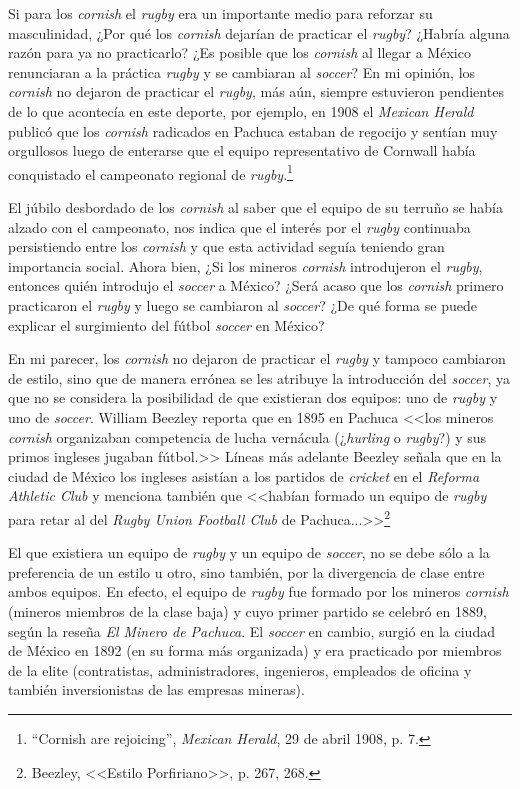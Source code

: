 \documentclass[11pt,a5paper,twoside]{book} %
\begin{document}
Si para los \emph{cornish} el \emph{rugby} era un importante medio para reforzar su masculinidad, ¿Por qué los \emph{cornish} dejarían de practicar el \emph{rugby}? ¿Habría alguna razón para ya no practicarlo? ¿Es posible que los \emph{cornish} al llegar a México renunciaran a la práctica \emph{rugby} y se cambiaran al \emph{soccer}? En mi opinión, los \emph{cornish} no dejaron de practicar el \emph{rugby}, más aún, siempre estuvieron pendientes de lo que acontecía en este deporte, por ejemplo, en 1908 el \emph{Mexican Herald} publicó que los \emph{cornish} radicados en Pachuca estaban de regocijo y sentían muy orgullosos luego de enterarse que el equipo representativo de Cornwall había conquistado el campeonato regional de \emph{rugby}.\footnote{``Cornish are rejoicing'', \emph{Mexican Herald}, 29 de abril 1908, p. 7.}

El júbilo desbordado de los \emph{cornish} al saber que el equipo de su terruño se había alzado con el campeonato, nos indica que el interés por el \emph{rugby} continuaba persistiendo entre los \emph{cornish} y que esta actividad seguía teniendo gran importancia social. Ahora bien, ¿Si los mineros \emph{cornish} introdujeron el \emph{rugby}, entonces quién introdujo el \emph{soccer} a México? ¿Será acaso que los \emph{cornish} primero practicaron el \emph{rugby} y luego se cambiaron al \emph{soccer}? ¿De qué forma se puede explicar el surgimiento del fútbol \emph{soccer} en México?

En mi parecer, los \emph{cornish} no dejaron de practicar el \emph{rugby} y tampoco cambiaron de estilo, sino que de manera errónea se les atribuye la introducción del \emph{soccer}, ya que no se considera la posibilidad de que existieran dos equipos: uno de \emph{rugby} y uno de \emph{soccer}. William Beezley reporta que en 1895 en Pachuca <<los mineros \emph{cornish} organizaban competencia de lucha vernácula (¿\emph{hurling} o \emph{rugby}?) y sus primos ingleses jugaban fútbol.>> Líneas más adelante Beezley señala que en la ciudad de México los ingleses asistían a los partidos de \emph{cricket} en el \emph{Reforma Athletic Club} y menciona también que <<habían formado un equipo de \emph{rugby} para retar al del \emph{Rugby Union Football Club} de Pachuca...>>\footnote{Beezley, <<Estilo Porfiriano>>, p. 267, 268.}

El que existiera un equipo de \emph{rugby} y un equipo de \emph{soccer}, no se debe sólo a la preferencia de un estilo u otro, sino también, por la divergencia de clase entre ambos equipos. En efecto, el equipo de \emph{rugby} fue formado por los mineros \emph{cornish} (mineros miembros de la clase baja) y cuyo primer partido se celebró en 1889, según la reseña \emph{El Minero de Pachuca}. El \emph{soccer} en cambio, surgió en la ciudad de México en 1892 (en su forma más organizada) y era practicado por miembros de la elite (contratistas, administradores, ingenieros, empleados de oficina y también inversionistas de las empresas mineras).
\end{document}
